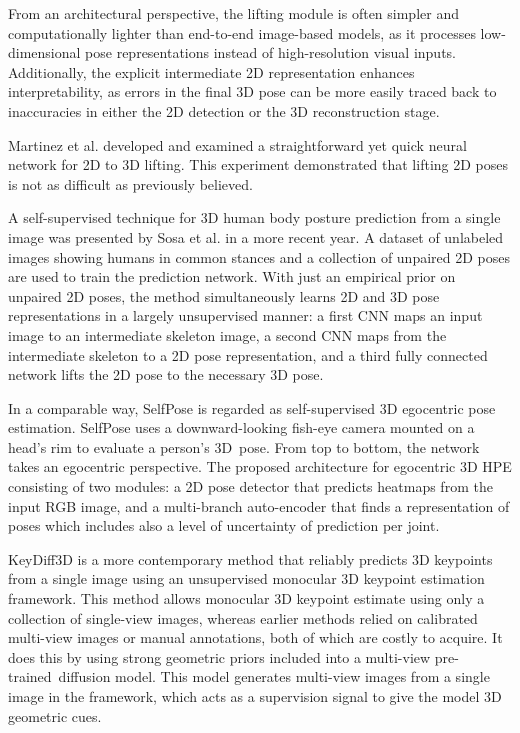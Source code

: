 From an architectural perspective, the lifting module is often simpler and computationally lighter than end-to-end image-based models, as it processes low-dimensional pose representations instead of high-resolution visual inputs. 
Additionally, the explicit intermediate 2D representation enhances interpretability, as errors in the final 3D pose can be more easily traced back to inaccuracies in either the 2D detection or the 3D reconstruction stage.

Martinez et al. \cite{martinez2017simple} developed and examined a straightforward yet quick neural network for 2D to 3D lifting. This experiment demonstrated that lifting 2D poses is not as difficult as previously believed.

A self-supervised technique for 3D human body posture prediction from a single image was presented by Sosa et al. \cite{sosa2023self} in a more recent year. A dataset of unlabeled images showing humans in common stances and a 
collection of unpaired 2D poses are used to train the prediction network. With just an empirical prior on unpaired 2D poses, the method simultaneously learns 2D and 3D pose representations in a largely unsupervised manner: a first 
CNN maps an input image to an intermediate skeleton image, a second CNN maps from the intermediate skeleton to a 2D pose representation, and a third fully connected network lifts the 2D pose to the necessary 3D pose.

In a comparable way, SelfPose \cite{tome2020selfpose} is regarded as self-supervised 3D egocentric pose estimation. SelfPose uses a downward-looking fish-eye camera mounted on a head's rim to evaluate a person's 3D pose. From top to 
bottom, the network takes an egocentric perspective. The proposed architecture for egocentric 3D HPE consisting of two modules: a 2D pose detector that predicts heatmaps from the input RGB image, and a multi-branch auto-encoder that 
finds a representation of poses which includes also a level of uncertainty of prediction per joint.

KeyDiff3D \cite{jeon2025unsupervised} is a more contemporary method that reliably predicts 3D keypoints from a single image using an unsupervised monocular 3D keypoint estimation framework. This method allows monocular 3D keypoint 
estimate using only a collection of single-view images, whereas earlier methods relied on calibrated multi-view images or manual annotations, both of which are costly to acquire. It does this by using strong geometric priors included 
into a multi-view pre-trained diffusion model. This model generates multi-view images from a single image in the framework, which acts as a supervision signal to give the model 3D geometric cues.


